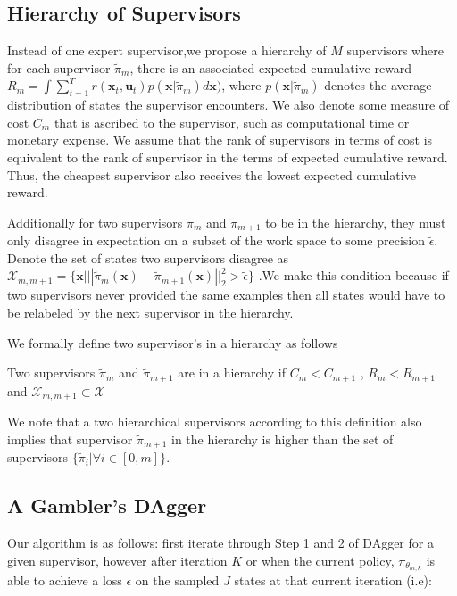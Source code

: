 \documentclass[10pt, conference]{ieeeconf}      %
\newenvironment{definition}[1][Definition]{\begin{trivlist}
\item[\hskip \labelsep {\bfseries #1}]}{\end{trivlist}}
\begin{document}
\subsection{Hierarchy of Supervisors}
Instead of one expert supervisor,we propose a hierarchy  of $M$ supervisors where for each supervisor $\tilde{\pi}_m$, there is an associated expected cumulative reward $R_m = \int \sum^T_{t=1} r(\mathbf{x}_t,\mathbf{u}_t) p(\mathbf{x}|\tilde{\pi}_m)d\mathbf{x})$, where $p(\mathbf{x}|\tilde{\pi}_m)$ denotes the average distribution of states the supervisor encounters. We also denote some measure of cost $C_m$ that is ascribed to the supervisor, such as computational time or monetary expense. We assume that the rank of supervisors in terms of cost is equivalent to the rank of supervisor in the terms of expected cumulative reward. Thus, the cheapest supervisor also receives the lowest expected cumulative reward. 

Additionally for two supervisors $\tilde{\pi}_m$ and $\tilde{\pi}_{m+1}$ to be in the hierarchy, they must only disagree in expectation on a subset of the work space to some precision $\tilde{\epsilon}$. Denote the set of states two supervisors disagree as $\mathcal{X}_{m,m+1} = \lbrace \mathbf{x} | ||\tilde{\pi}_m(\mathbf{x}) - \tilde{\pi}_{m+1}(\mathbf{x}) ||^2_2 > \tilde{\epsilon} \rbrace$ .We make this condition because if two supervisors never provided the same examples then all states would have to be relabeled by the next supervisor in the hierarchy. 

We formally define two supervisor's in a hierarchy as follows

\begin{definition} Two supervisors $\tilde{\pi}_m$ and $\tilde{\pi}_{m+1}$ are in a hierarchy if  $C_m < C_{m+1}$ , $R_m < R_{m+1}$ and  $\mathcal{X}_{m,m+1} \subset \mathcal{X}$
\end{definition}

We note that a two hierarchical supervisors according to this definition also implies that supervisor $\tilde{\pi}_{m+1}$ in the hierarchy is higher than the set of supervisors $\lbrace \tilde{\pi}_i | \forall i \in [0,m] \rbrace$. 

\subsection{A Gambler's DAgger}
Our algorithm is as follows: first iterate through Step 1 and 2 of DAgger for a given supervisor, however after iteration $K$ or when the current policy, $\pi_{\theta_{m,k}}$ is able to achieve a loss $\epsilon$ on the sampled $J$ states at that current iteration (i.e): 
\end{document}
